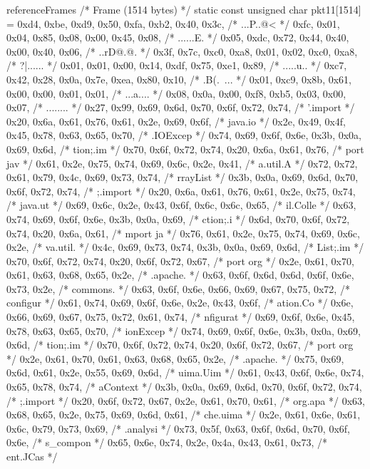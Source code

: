 \begin{chunk}{referenceFrames}
/* Frame (1514 bytes) */
static const unsigned char pkt11[1514] = {
0xd4, 0xbe, 0xd9, 0x50, 0xfa, 0xb2, 0x40, 0x3c, /* ...P..@< */
0xfc, 0x01, 0x04, 0x85, 0x08, 0x00, 0x45, 0x08, /* ......E. */
0x05, 0xdc, 0x72, 0x44, 0x40, 0x00, 0x40, 0x06, /* ..rD@.@. */
0x3f, 0x7c, 0xc0, 0xa8, 0x01, 0x02, 0xc0, 0xa8, /* ?|...... */
0x01, 0x01, 0x00, 0x14, 0xdf, 0x75, 0xe1, 0x89, /* .....u.. */
0xc7, 0x42, 0x28, 0x0a, 0x7e, 0xea, 0x80, 0x10, /* .B(.~... */
0x01, 0xc9, 0x8b, 0x61, 0x00, 0x00, 0x01, 0x01, /* ...a.... */
0x08, 0x0a, 0x00, 0xf8, 0xb5, 0x03, 0x00, 0x07, /* ........ */
0x27, 0x99, 0x69, 0x6d, 0x70, 0x6f, 0x72, 0x74, /* '.import */
0x20, 0x6a, 0x61, 0x76, 0x61, 0x2e, 0x69, 0x6f, /*  java.io */
0x2e, 0x49, 0x4f, 0x45, 0x78, 0x63, 0x65, 0x70, /* .IOExcep */
0x74, 0x69, 0x6f, 0x6e, 0x3b, 0x0a, 0x69, 0x6d, /* tion;.im */
0x70, 0x6f, 0x72, 0x74, 0x20, 0x6a, 0x61, 0x76, /* port jav */
0x61, 0x2e, 0x75, 0x74, 0x69, 0x6c, 0x2e, 0x41, /* a.util.A */
0x72, 0x72, 0x61, 0x79, 0x4c, 0x69, 0x73, 0x74, /* rrayList */
0x3b, 0x0a, 0x69, 0x6d, 0x70, 0x6f, 0x72, 0x74, /* ;.import */
0x20, 0x6a, 0x61, 0x76, 0x61, 0x2e, 0x75, 0x74, /*  java.ut */
0x69, 0x6c, 0x2e, 0x43, 0x6f, 0x6c, 0x6c, 0x65, /* il.Colle */
0x63, 0x74, 0x69, 0x6f, 0x6e, 0x3b, 0x0a, 0x69, /* ction;.i */
0x6d, 0x70, 0x6f, 0x72, 0x74, 0x20, 0x6a, 0x61, /* mport ja */
0x76, 0x61, 0x2e, 0x75, 0x74, 0x69, 0x6c, 0x2e, /* va.util. */
0x4c, 0x69, 0x73, 0x74, 0x3b, 0x0a, 0x69, 0x6d, /* List;.im */
0x70, 0x6f, 0x72, 0x74, 0x20, 0x6f, 0x72, 0x67, /* port org */
0x2e, 0x61, 0x70, 0x61, 0x63, 0x68, 0x65, 0x2e, /* .apache. */
0x63, 0x6f, 0x6d, 0x6d, 0x6f, 0x6e, 0x73, 0x2e, /* commons. */
0x63, 0x6f, 0x6e, 0x66, 0x69, 0x67, 0x75, 0x72, /* configur */
0x61, 0x74, 0x69, 0x6f, 0x6e, 0x2e, 0x43, 0x6f, /* ation.Co */
0x6e, 0x66, 0x69, 0x67, 0x75, 0x72, 0x61, 0x74, /* nfigurat */
0x69, 0x6f, 0x6e, 0x45, 0x78, 0x63, 0x65, 0x70, /* ionExcep */
0x74, 0x69, 0x6f, 0x6e, 0x3b, 0x0a, 0x69, 0x6d, /* tion;.im */
0x70, 0x6f, 0x72, 0x74, 0x20, 0x6f, 0x72, 0x67, /* port org */
0x2e, 0x61, 0x70, 0x61, 0x63, 0x68, 0x65, 0x2e, /* .apache. */
0x75, 0x69, 0x6d, 0x61, 0x2e, 0x55, 0x69, 0x6d, /* uima.Uim */
0x61, 0x43, 0x6f, 0x6e, 0x74, 0x65, 0x78, 0x74, /* aContext */
0x3b, 0x0a, 0x69, 0x6d, 0x70, 0x6f, 0x72, 0x74, /* ;.import */
0x20, 0x6f, 0x72, 0x67, 0x2e, 0x61, 0x70, 0x61, /*  org.apa */
0x63, 0x68, 0x65, 0x2e, 0x75, 0x69, 0x6d, 0x61, /* che.uima */
0x2e, 0x61, 0x6e, 0x61, 0x6c, 0x79, 0x73, 0x69, /* .analysi */
0x73, 0x5f, 0x63, 0x6f, 0x6d, 0x70, 0x6f, 0x6e, /* s_compon */
0x65, 0x6e, 0x74, 0x2e, 0x4a, 0x43, 0x61, 0x73, /* ent.JCas */
}
\end{chunk}

